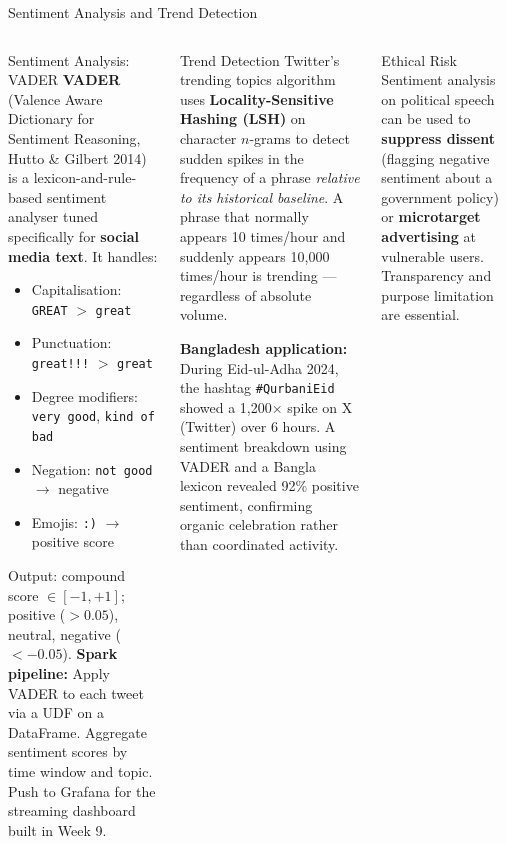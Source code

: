 \documentclass[aspectratio=169,10pt]{beamer}
\begin{document}
\begin{frame}{Sentiment Analysis and Trend Detection}
  \begin{columns}[T]
      \begin{block}{Sentiment Analysis: VADER}
        \textbf{VADER} (Valence Aware Dictionary for Sentiment Reasoning, Hutto \& Gilbert 2014) is a lexicon-and-rule-based sentiment analyser tuned specifically for \textbf{social media text}.  It handles:
        \begin{itemize}
          \item Capitalisation: \texttt{GREAT} $>$ \texttt{great}
          \item Punctuation: \texttt{great!!!} $>$ \texttt{great}
          \item Degree modifiers: \texttt{very good}, \texttt{kind of bad}
          \item Negation: \texttt{not good} $\to$ negative
          \item Emojis: \texttt{:)} $\to$ positive score
        \end{itemize}
        Output: compound score $\in [-1, +1]$; positive ($>0.05$), neutral, negative ($<-0.05$).
        \vspace{4pt}
        \textbf{Spark pipeline:}  Apply VADER to each tweet via a UDF on a DataFrame.  Aggregate sentiment scores by time window and topic.  Push to Grafana for the streaming dashboard built in Week 9.
      \end{block}

      \begin{exampleblock}{Trend Detection}
        \small Twitter's trending topics algorithm uses \textbf{Locality-Sensitive Hashing (LSH)} on character $n$-grams to detect sudden spikes in the frequency of a phrase \textit{relative to its historical baseline}.  A phrase that normally appears 10 times/hour and suddenly appears 10{,}000 times/hour is trending --- regardless of absolute volume.
        \vspace{6pt}

        \textbf{Bangladesh application:} During Eid-ul-Adha 2024, the hashtag \texttt{\#QurbaniEid} showed a 1{,}200× spike on X (Twitter) over 6 hours.  A sentiment breakdown using VADER and a Bangla lexicon revealed 92\% positive sentiment, confirming organic celebration rather than coordinated activity.
      \end{exampleblock}
      \vspace{4pt}
      \begin{alertblock}{Ethical Risk}
        \small Sentiment analysis on political speech can be used to \textbf{suppress dissent} (flagging negative sentiment about a government policy) or \textbf{microtarget advertising} at vulnerable users.  Transparency and purpose limitation are essential.
      \end{alertblock}
  \end{columns}
\end{frame}
\end{document}
